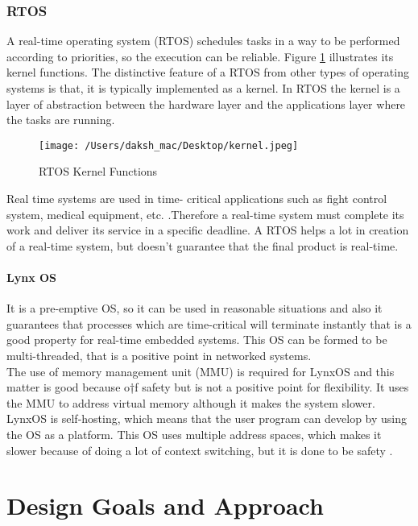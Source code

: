 \documentclass[12pt]{article}
\begin{document}
\subsubsection{RTOS}
A real-time operating system (RTOS) schedules tasks in a way to be performed according to priorities, so the execution can be reliable. Figure \ref{fig:kernel}
illustrates its kernel functions. The distinctive feature of a RTOS from other types of operating systems is that, it is typically implemented as a
kernel. In RTOS the kernel is a layer of abstraction between the hardware layer and the applications layer where the tasks are running.

\begin{figure}[H]
	\centering
	\texttt{[image: /Users/daksh\_mac/Desktop/kernel.jpeg]}
	\caption[About kernel functions]{RTOS Kernel Functions}
	\label{fig:kernel}	
\end{figure}

Real time systems are used in time- critical applications such as fight control system, medical equipment, etc. .Therefore a real-time system must
complete its work and deliver its service in a specific deadline. A RTOS helps a lot in creation of a real-time system, but doesn’t guarantee that
the final product is real-time.

\paragraph{Lynx OS}

It is a pre-emptive OS, so it can be used in reasonable situations and also it guarantees that processes which are time-critical will terminate
instantly that is a good property for real-time embedded systems. This OS can be formed to be multi-threaded, that is a positive point in
networked systems.\\
The use of memory management unit (MMU) is required for LynxOS and this matter is good because o†f safety but is not a positive point for
flexibility. It uses the MMU to address virtual memory although it makes the system slower. LynxOS is self-hosting, which means that the user
program can develop by using the OS as a platform. This OS uses multiple address spaces, which makes it slower because of doing a lot of
context switching, but it is done to be safety \cite{ref:per}.


\section{Design Goals and Approach}\label{sec:design}
\end{document}
